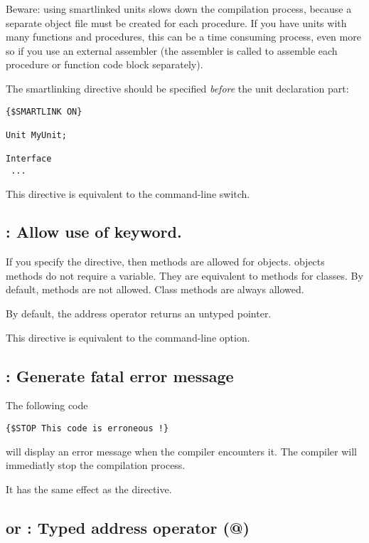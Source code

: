 Beware: using smartlinked units slows down the compilation process, because
a separate object file must be created for each procedure. If you have units
with many functions and procedures, this can be a time consuming process,
even more so if you use an external assembler (the assembler is called to
assemble each procedure or function code block separately).

The smartlinking directive should be specified {\em before} the unit
declaration part:
\begin{verbatim}
{$SMARTLINK ON}

Unit MyUnit;

Interface
 ...
\end{verbatim}

This directive is equivalent to the  command-line switch.

\subsection{ : Allow use of  keyword.}

If you specify the  directive, then 
methods are allowed for objects.  objects methods do not require
a  variable. They are equivalent to  methods for
classes. By default,  methods are not allowed. Class methods
are always allowed.

By default, the address operator returns an untyped pointer.

This directive is equivalent to the  command-line option.

\subsection{ : Generate fatal error message}

The following code
\begin{verbatim}
{$STOP This code is erroneous !}
\end{verbatim}
will display an error message when the compiler encounters it.
The compiler will immediatly stop the compilation process.

It has the same effect as the  directive.

\subsection{ or  : Typed address operator (@)}

